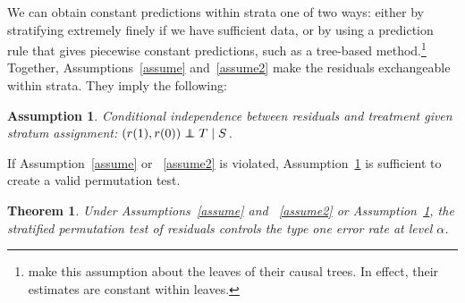 \documentclass[12pt]{article}
\newtheorem{theorem}{Theorem}[section]
\newtheorem{assumption}{Assumption}
\newcommand\independent{\protect\mathpalette{\protect\independenT}{\perp}}
\def\independenT#1#2{\mathrel{\rlap{$#1#2$}\mkern2mu{#1#2}}}
\begin{document}
\noindent We can obtain constant predictions within strata one of two ways: either by stratifying extremely finely if we have sufficient data, or
by using a prediction rule that gives piecewise constant predictions, such as a tree-based method.\footnote{
\citet{wager_estimation_2015} make this assumption about the leaves of their causal trees.
In effect, their estimates are constant within leaves.
}
Together, Assumptions~\ref{assume} and~\ref{assume2} make the residuals exchangeable within strata.
They imply the following:

\begin{assumption}\label{assume3}
Conditional independence between residuals and treatment given stratum assignment: $(r(1), r(0)) \independent T \mid S$.
\end{assumption}

\noindent If Assumption~\ref{assume} or ~\ref{assume2} is violated, Assumption~\ref{assume3} is sufficient to create a valid permutation test.

\begin{theorem}\label{thm:permutation}
Under Assumptions~\ref{assume} and ~\ref{assume2} or Assumption~\ref{assume3}, the stratified permutation test of residuals controls the type one error rate at level $\alpha$.
\end{theorem}
\end{document}
